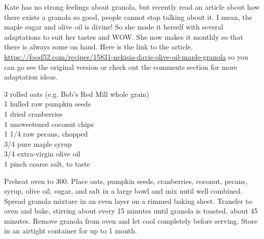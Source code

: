 \begin{open}
Kate has no strong feelings about granola, but recently read an article about how there exists a granola so good, people cannot stop talking about it. I mean, the maple sugar and olive oil is divine! So she made it herself with several adaptations to suit her tastes and WOW. She now makes it monthly so that there is always some on hand. Here is the link to the article, \url{ https://food52.com/recipes/15831-nekisia-davis-olive-oil-maple-granola} so you can go see the original version or check out the comments section for more adaptation ideas. 
\end{open}
\begin{ingredients}
    \SI{3}{\cup} rolled oats (e.g. Bob's Red Mill whole grain)\\
    \SI{1}{\cup} hulled raw pumpkin seeds\\
    \SI{1}{\cup} dried cranberries\\
    \SI{1}{\cup} unsweetened coconut chips\\
    1 \SI{1/4}{\cup} raw pecans, chopped\\
    \SI{3/4}{\cup} pure maple syrup\\
    \SI{3/4}{\cup} extra-virgin olive oil\\
    1 pinch coarse salt, to taste\\
\end{ingredients}
Preheat oven to \SI{300}{\degreeF}. Place oats, pumpkin seeds, cranberries, coconut, pecans, syrup, olive oil, sugar, and salt in a large bowl and mix until well combined. Spread granola mixture in an even layer on a rimmed baking sheet. Transfer to oven and bake, stirring about every 15 minutes until granola is toasted, about 45 minutes. Remove granola from oven and let cool completely before serving. Store in an airtight container for up to 1 month.